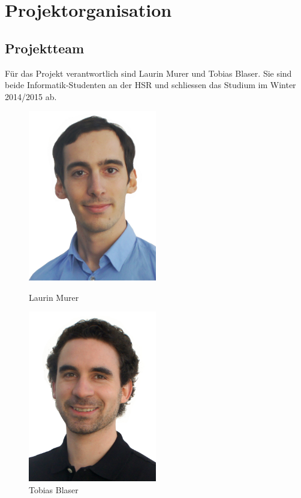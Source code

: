 \chapter{Projektorganisation}

	\section{Projektteam}
	Für das Projekt verantwortlich sind Laurin Murer und Tobias Blaser.
	Sie sind beide Informatik-Studenten an der HSR und schliessen das Studium im Winter 2014/2015 ab.
	
	\begin{figure}[H]
		\begin{minipage}[b]{0.5\linewidth}
			\includegraphics[width=0.5\textwidth]{projectPlan/media/img/lmurer.jpg}
			\centering
			\caption{Laurin Murer}
			\label{fig:laurinmurer}
		\end{minipage}
		\begin{minipage}[b]{0.5\linewidth}
			\includegraphics[width=0.5\textwidth]{projectPlan/media/img/tblaser.jpg}
			\centering
			\caption{Tobias Blaser}
			\label{fig:tobiasblaser}
		\end{minipage}
	\end{figure}


